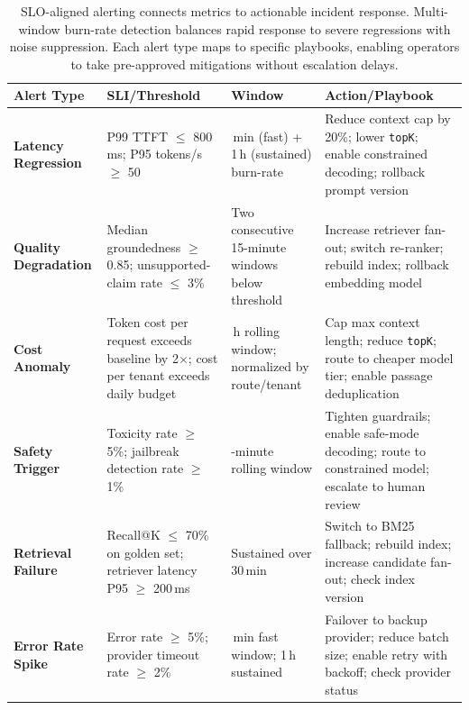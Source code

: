 \begin{table}[t]
\centering
\small
\caption{SLO-aligned alerting connects metrics to actionable incident response. Multi-window burn-rate detection balances rapid response to severe regressions with noise suppression. Each alert type maps to specific playbooks, enabling operators to take pre-approved mitigations without escalation delays.}
\label{tab:ch05_alert_types_thresholds}
\setlength{\tabcolsep}{6pt}
\renewcommand{\arraystretch}{1.3}
\begin{tabularx}{\linewidth}{@{}>{\raggedright\arraybackslash}p{3.2cm}>{\raggedright\arraybackslash}X>{\raggedright\arraybackslash}X>{\raggedright\arraybackslash}X@{}}
\toprule
\rowcolor{gray!15}
\textbf{Alert Type} & \textbf{SLI/Threshold} & \textbf{Window} & \textbf{Action/Playbook} \\
\midrule
\rowcolor{blue!8}
\textbf{Latency Regression} & P99 TTFT $\leq$ 800\,ms; P95 tokens/s $\geq$ 50 & 5\,min (fast) + 1\,h (sustained) burn-rate & Reduce context cap by 20\%; lower \texttt{topK}; enable constrained decoding; rollback prompt version \\
\addlinespace[2pt]
\rowcolor{orange!10}
\textbf{Quality Degradation} & Median groundedness $\geq$ 0.85; unsupported-claim rate $\leq$ 3\% & Two consecutive 15-minute windows below threshold & Increase retriever fan-out; switch re-ranker; rebuild index; rollback embedding model \\
\addlinespace[2pt]
\rowcolor{orange!10}
\textbf{Cost Anomaly} & Token cost per request exceeds baseline by 2$\times$; cost per tenant exceeds daily budget & 1\,h rolling window; normalized by route/tenant & Cap max context length; reduce \texttt{topK}; route to cheaper model tier; enable passage deduplication \\
\addlinespace[2pt]
\rowcolor{red!8}
\textbf{Safety Trigger} & Toxicity rate $\geq$ 5\%; jailbreak detection rate $\geq$ 1\% & 15-minute rolling window & Tighten guardrails; enable safe-mode decoding; route to constrained model; escalate to human review \\
\addlinespace[2pt]
\rowcolor{orange!10}
\textbf{Retrieval Failure} & Recall@K $\leq$ 70\% on golden set; retriever latency P95 $\geq$ 200\,ms & Sustained over 30\,min & Switch to BM25 fallback; rebuild index; increase candidate fan-out; check index version \\
\addlinespace[2pt]
\rowcolor{red!8}
\textbf{Error Rate Spike} & Error rate $\geq$ 5\%; provider timeout rate $\geq$ 2\% & 5\,min fast window; 1\,h sustained & Failover to backup provider; reduce batch size; enable retry with backoff; check provider status \\
\bottomrule
\end{tabularx}
\end{table}

